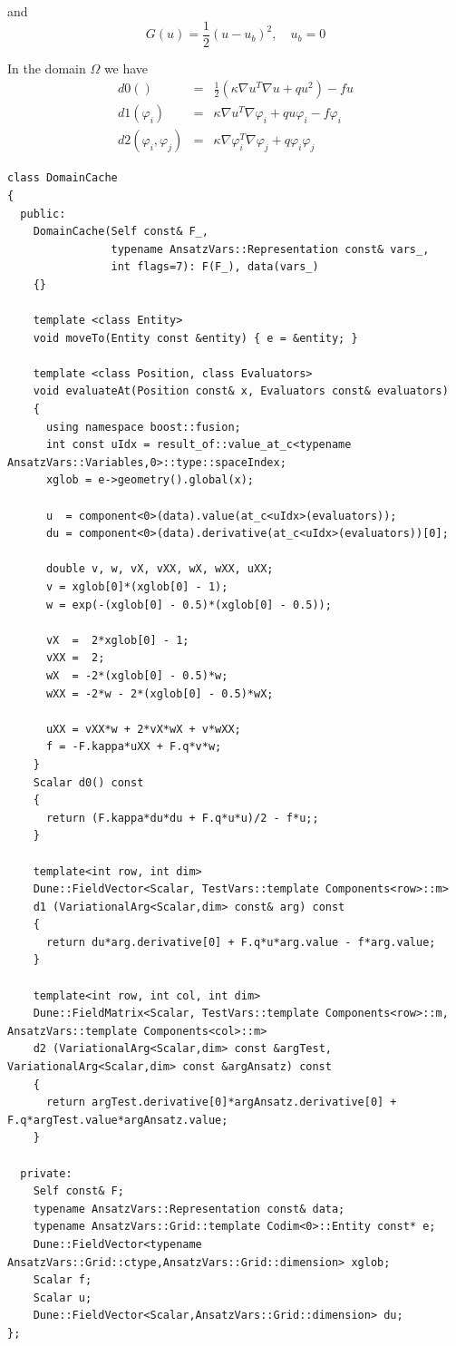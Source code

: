 \documentclass[11pt]{article}
\begin{document}
\noindent and 
\[
G(u) = \frac{1}{2} (u-u_b)^2, \quad u_b = 0
\]

\noindent In the domain $\Omega$ we have 
\begin{eqnarray}{}
d0() &=& \frac{1}{2} (\kappa \nabla u^T \nabla u  + q u^2) -  f u\\
d1(\varphi_i) &=& \kappa \nabla u^T \nabla\varphi_i + q u \varphi_i - f \varphi_i \\
d2(\varphi_i,\varphi_j) &=& \kappa \nabla \varphi_i^T \nabla \varphi_j + q \varphi_i \varphi_j
\end{eqnarray}

\vspace{-3mm}
\begin{lstlisting}
class DomainCache 
{
  public:
    DomainCache(Self const& F_,
                typename AnsatzVars::Representation const& vars_,
                int flags=7): F(F_), data(vars_) 
    {}

    template <class Entity>
    void moveTo(Entity const &entity) { e = &entity; }

    template <class Position, class Evaluators>
    void evaluateAt(Position const& x, Evaluators const& evaluators) 
    {
      using namespace boost::fusion;
      int const uIdx = result_of::value_at_c<typename AnsatzVars::Variables,0>::type::spaceIndex;
      xglob = e->geometry().global(x);

      u  = component<0>(data).value(at_c<uIdx>(evaluators));
      du = component<0>(data).derivative(at_c<uIdx>(evaluators))[0];
      
      double v, w, vX, vXX, wX, wXX, uXX;
      v = xglob[0]*(xglob[0] - 1);
      w = exp(-(xglob[0] - 0.5)*(xglob[0] - 0.5));
      
      vX  =  2*xglob[0] - 1;
      vXX =  2;
      wX  = -2*(xglob[0] - 0.5)*w;
      wXX = -2*w - 2*(xglob[0] - 0.5)*wX;

      uXX = vXX*w + 2*vX*wX + v*wXX;
      f = -F.kappa*uXX + F.q*v*w;
    }
    Scalar d0() const 
    {
      return (F.kappa*du*du + F.q*u*u)/2 - f*u;;
    }
        
    template<int row, int dim> 
    Dune::FieldVector<Scalar, TestVars::template Components<row>::m>
    d1 (VariationalArg<Scalar,dim> const& arg) const 
    {
      return du*arg.derivative[0] + F.q*u*arg.value - f*arg.value; 
    }
    
    template<int row, int col, int dim> 
    Dune::FieldMatrix<Scalar, TestVars::template Components<row>::m, AnsatzVars::template Components<col>::m>
    d2 (VariationalArg<Scalar,dim> const &argTest, VariationalArg<Scalar,dim> const &argAnsatz) const 
    {
      return argTest.derivative[0]*argAnsatz.derivative[0] + F.q*argTest.value*argAnsatz.value;
    }

  private:
    Self const& F;
    typename AnsatzVars::Representation const& data;
    typename AnsatzVars::Grid::template Codim<0>::Entity const* e;
    Dune::FieldVector<typename AnsatzVars::Grid::ctype,AnsatzVars::Grid::dimension> xglob;
    Scalar f;
    Scalar u;
    Dune::FieldVector<Scalar,AnsatzVars::Grid::dimension> du;
};
\end{lstlisting}
\end{document}
